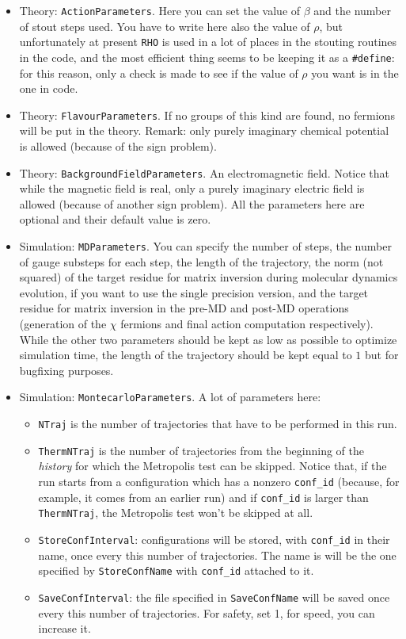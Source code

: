 \begin{itemize}
    \item{Theory: \verb|ActionParameters|.}
        Here you can set the value of $\beta$ and the number of stout steps used. You 
        have to write here also the value of $\rho$, but unfortunately at present 
        \verb|RHO| is used in a lot of places in the stouting routines in the code, and 
        the most efficient thing seems to be keeping it as a \verb|#define|: for this 
        reason, only a check is made to see if the value of $\rho$ you want is in 
        the one in code.
    \item{Theory: \verb|FlavourParameters|.}
        If no groups of this kind are found, no fermions will be put in the theory.
        Remark: only purely imaginary chemical potential is allowed (because of the 
        sign problem). 
    \item{Theory: \verb|BackgroundFieldParameters|.}
        An electromagnetic field. Notice that while the magnetic field is real, only 
        a purely imaginary electric field is allowed (because of another sign 
problem). All the parameters here are optional and their default value is zero.
    \item{Simulation: \verb|MDParameters|.} You can specify the number of steps, 
        the number of gauge substeps for each step, the length of the 
        trajectory, the norm (not squared) of the target residue for matrix 
        inversion during molecular dynamics evolution, if you want to use 
        the single precision version, and the target residue for matrix 
inversion in the pre-MD and post-MD operations (generation of the $\chi$ 
fermions and final action computation respectively). While the other two 
parameters should be kept as 
        low as possible to optimize simulation time, the length of the trajectory 
        should be kept equal to $1$ but for bugfixing purposes.

\item{Simulation: \verb|MontecarloParameters|.} A lot of parameters here: 
\begin{itemize}
\item \verb|NTraj| is the number of trajectories that have to be performed in 
    this run.
\item \verb|ThermNTraj| is the number of trajectories from the beginning of the 
    \emph{history} for which the Metropolis test can be skipped. Notice that, 
if 
    the run starts from a configuration which has a nonzero \verb|conf_id| 
    (because, for example, it comes from an earlier run) and if \verb|conf_id| 
is 
    larger than \verb|ThermNTraj|, the Metropolis test won't be skipped at all.
\item \verb|StoreConfInterval|: configurations will be stored, with 
    \verb|conf_id| in their name, once every this number of trajectories. The 
name 
    is will be the one specified by \verb|StoreConfName| with \verb|conf_id| 
    attached to it. 
\item \verb|SaveConfInterval|: the file specified in \verb|SaveConfName| will 
    be saved once every this number of trajectories. For safety, set 1, for 
speed, 
    you can increase it.


\end{itemize}
\end{itemize}
